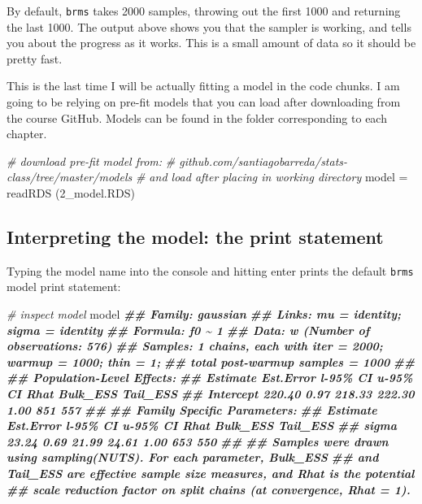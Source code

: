 \documentclass[
]{book}
\newenvironment{Shaded}{\begin{snugshade}}{\end{snugshade}}
\newcommand{\CommentTok}[1]{\textcolor[rgb]{0.56,0.35,0.01}{\textit{#1}}}
\newcommand{\DocumentationTok}[1]{\textcolor[rgb]{0.56,0.35,0.01}{\textbf{\textit{#1}}}}
\newcommand{\FunctionTok}[1]{\textcolor[rgb]{0.00,0.00,0.00}{#1}}
\newcommand{\NormalTok}[1]{#1}
\newcommand{\OtherTok}[1]{\textcolor[rgb]{0.56,0.35,0.01}{#1}}
\newcommand{\StringTok}[1]{\textcolor[rgb]{0.31,0.60,0.02}{#1}}
\begin{document}
By default, \texttt{brms} takes 2000 samples, throwing out the first 1000 and returning the last 1000. The output above shows you that the sampler is working, and tells you about the progress as it works. This is a small amount of data so it should be pretty fast.

This is the last time I will be actually fitting a model in the code chunks. I am going to be relying on pre-fit models that you can load after downloading from the course GitHub. Models can be found in the folder corresponding to each chapter.

\begin{Shaded}
\begin{Highlighting}[]
\CommentTok{\# download pre{-}fit model from: }
\CommentTok{\# github.com/santiagobarreda/stats{-}class/tree/master/models}
\CommentTok{\# and load after placing in working directory}
\NormalTok{model }\OtherTok{=} \FunctionTok{readRDS}\NormalTok{ (}\StringTok{\textquotesingle{}2\_model.RDS\textquotesingle{}}\NormalTok{)}
\end{Highlighting}
\end{Shaded}

\hypertarget{interpreting-the-model-the-print-statement}{%
\subsection{Interpreting the model: the print statement}\label{interpreting-the-model-the-print-statement}}

Typing the model name into the console and hitting enter prints the default \texttt{brms} model print statement:

\begin{Shaded}
\begin{Highlighting}[]
\CommentTok{\# inspect model}
\NormalTok{model}
\DocumentationTok{\#\#  Family: gaussian }
\DocumentationTok{\#\#   Links: mu = identity; sigma = identity }
\DocumentationTok{\#\# Formula: f0 \textasciitilde{} 1 }
\DocumentationTok{\#\#    Data: w (Number of observations: 576) }
\DocumentationTok{\#\# Samples: 1 chains, each with iter = 2000; warmup = 1000; thin = 1;}
\DocumentationTok{\#\#          total post{-}warmup samples = 1000}
\DocumentationTok{\#\# }
\DocumentationTok{\#\# Population{-}Level Effects: }
\DocumentationTok{\#\#           Estimate Est.Error l{-}95\% CI u{-}95\% CI Rhat Bulk\_ESS Tail\_ESS}
\DocumentationTok{\#\# Intercept   220.40      0.97   218.33   222.30 1.00      851      557}
\DocumentationTok{\#\# }
\DocumentationTok{\#\# Family Specific Parameters: }
\DocumentationTok{\#\#       Estimate Est.Error l{-}95\% CI u{-}95\% CI Rhat Bulk\_ESS Tail\_ESS}
\DocumentationTok{\#\# sigma    23.24      0.69    21.99    24.61 1.00      653      550}
\DocumentationTok{\#\# }
\DocumentationTok{\#\# Samples were drawn using sampling(NUTS). For each parameter, Bulk\_ESS}
\DocumentationTok{\#\# and Tail\_ESS are effective sample size measures, and Rhat is the potential}
\DocumentationTok{\#\# scale reduction factor on split chains (at convergence, Rhat = 1).}
\end{Highlighting}
\end{Shaded}
\end{document}
